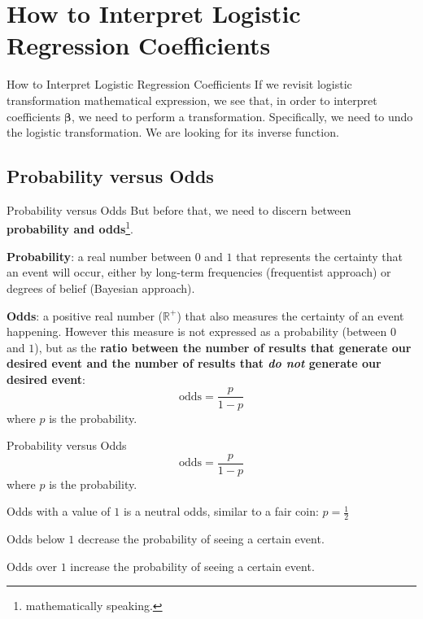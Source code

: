 \section*{How to Interpret Logistic Regression Coefficients}
\begin{frame}[noframenumbering]{How to Interpret Logistic Regression Coefficients}
    If we revisit logistic transformation mathematical expression,
    we see that, in order to interpret coefficients $\boldsymbol{\beta}$,
    we need to perform a transformation.
    \vfill
    Specifically, we need to undo the logistic transformation.
    We are looking for its inverse function.
\end{frame}

\subsection*{Probability versus Odds}
\begin{frame}[noframenumbering]{Probability versus Odds}
    \small
    But before that, we need to discern between
    \textbf{probability and odds}\footnote{mathematically speaking.}.
    \begin{vfilleditems}
        \item \small \textbf{Probability}: a real number between $0$ and $1$
        that represents the certainty that an event will occur,
        either by long-term frequencies (frequentist approach) or
        degrees of belief (Bayesian approach).
        \item \small \textbf{Odds}: a positive real number ($\mathbb{R}^+$)
        that also measures the certainty of an event happening.
        However this measure is not expressed as a probability
        (between $0$ and $1$),
        but as the \textbf{ratio between the number of results that
            generate our desired event and the number of results that
            \textit{do not} generate our desired event}:
        $$
            \text{odds} = \frac{p}{1-p}
        $$
        where $p$ is the probability.
    \end{vfilleditems}
\end{frame}

\begin{frame}[noframenumbering]{Probability versus Odds}
    $$
        \text{odds} = \frac{p}{1-p}
    $$
    where $p$ is the probability.
    \vfill
    \begin{vfilleditems}
        \item Odds with a value of $1$ is a neutral odds,
        similar to a fair coin: $p = \frac{1}{2}$
        \item Odds below $1$ decrease the probability of seeing a certain event.
        \item Odds over $1$ increase the probability of seeing a certain event.
    \end{vfilleditems}
\end{frame}

